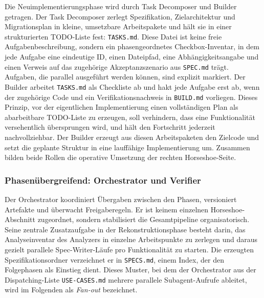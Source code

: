 Die Neuimplementierungsphase wird durch Task Decomposer und Builder getragen. Der Task Decomposer zerlegt Spezifikation, Zielarchitektur und Migrationsplan in kleine, umsetzbare Arbeitspakete und hält sie in einer strukturierten TODO-Liste fest: \texttt{TASKS.md}. Diese Datei ist keine freie Aufgabenbeschreibung, sondern ein phasengeordnetes Checkbox-Inventar, in dem jede Aufgabe eine eindeutige ID, einen Dateipfad, eine Abhängigkeitsangabe und einen Verweis auf das zugehörige Akzeptanzszenario aus \texttt{SPEC.md} trägt. Aufgaben, die parallel ausgeführt werden können, sind explizit markiert. Der Builder arbeitet \texttt{TASKS.md} als Checkliste ab und hakt jede Aufgabe erst ab, wenn der zugehörige Code und ein Verifikationsnachweis in \texttt{BUILD.md} vorliegen. Dieses Prinzip, vor der eigentlichen Implementierung einen vollständigen Plan als abarbeitbare TODO-Liste zu erzeugen, soll verhindern, dass eine Funktionalität versehentlich übersprungen wird, und hält den Fortschritt jederzeit nachvollziehbar. Der Builder erzeugt aus diesen Arbeitspaketen den Zielcode und setzt die geplante Struktur in eine lauffähige Implementierung um. Zusammen bilden beide Rollen die operative Umsetzung der rechten Horseshoe-Seite.

\subsubsection{Phasenübergreifend: Orchestrator und Verifier}

Der Orchestrator koordiniert Übergaben zwischen den Phasen, versioniert Artefakte und überwacht Freigaberegeln. Er ist keinem einzelnen Horseshoe-Abschnitt zugeordnet, sondern stabilisiert die Gesamtpipeline organisatorisch. Seine zentrale Zusatzaufgabe in der Rekonstruktionsphase besteht darin, das Analyseinventar des Analyzers in einzelne Arbeitspunkte zu zerlegen und daraus gezielt parallele Spec-Writer-Läufe pro Funktionalität zu starten. Die erzeugten Spezifikationsordner verzeichnet er in \texttt{SPECS.md}, einem Index, der den Folgephasen als Einstieg dient. Dieses Muster, bei dem der Orchestrator aus der Dispatching-Liste \texttt{USE-CASES.md} mehrere parallele Subagent-Aufrufe ableitet, wird im Folgenden als \emph{Fan-out} bezeichnet.

